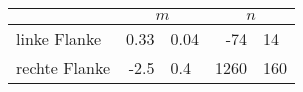 \label{tab:geraden2}
	\begin{tabular}{lr@{${}\pm{}$}lr@{${}\pm{}$}l}
		\toprule
		{} & \multicolumn{2}{c}{$m$} & \multicolumn{2}{c}{$n$} \\
		\midrule
		{linke Flanke}  & 0.33 & 0.04 &  -74 &  14 \\
		{rechte Flanke} & -2.5 & 0.4  & 1260 & 160 \\
		\bottomrule
	\end{tabular}
